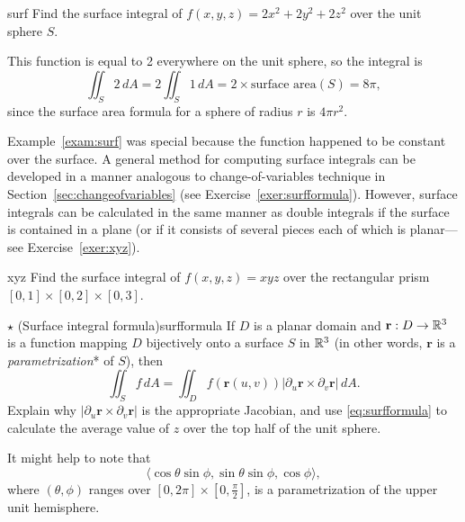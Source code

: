 \documentclass[svgnames]{report}
\begin{document}
\begin{example}{}{surf}
  Find the surface integral of $f(x,y,z) = 2x^2 +2y^2 + 2z^2$ over the
  unit sphere $S$. 
\end{example}

\begin{solution}
  This function is equal to 2 everywhere on the unit sphere, so the
  integral is
  \[
    \iint_{S} 2 \,dA =     2 \iint_{S} 1 \,dA = 2 \times \text{surface
      area}(S) = 8\pi, 
  \]
  since the surface area formula for a sphere of radius $r$ is $4\pi
  r^2$. 
\end{solution}

Example~\ref{exam:surf} was special because the function happened to
be constant over the surface. A general method for computing surface
integrals can be developed in a manner analogous to
change-of-variables technique in
Section~\ref{sec:changeofvariables} (see Exercise~\ref{exer:surfformula}).
However, surface integrals can be
calculated in the same manner as double integrals if the surface is
contained in a plane (or if it consists of several pieces each of
which is planar---see Exercise~\ref{exer:xyz}). 

\begin{exercise}{}{xyz}
  Find the surface integral of $f(x,y,z) = xyz$ over the rectangular
  prism $[0,1] \times [0,2] \times [0,3]$. 
\end{exercise}

\begin{exercise}{$\star$ (Surface integral formula)}{surfformula}
  If $D$ is a planar domain and $\mathbf{r}:D \to \mathbb{R}^3$ is a function
  mapping $D$ bijectively onto a surface $S$ in $\mathbb{R}^3$ (in other words,
  $\mathbf{r}$ is a \textit{parametrization}* of $S$), then
  \begin{equation} \label{eq:surfformula} 
    \iint_S f \, dA = \iint_D f(\mathbf{r}(u,v)) |\partial_u
    \mathbf{r} \times \partial_v \mathbf{r}| \, dA. 
  \end{equation}
  Explain why $|\partial_u
    \mathbf{r} \times \partial_v \mathbf{r}|$ is the appropriate
    Jacobian, and use \eqref{eq:surfformula} to calculate the average value of
    $z$ over the top half of the unit sphere.

    It might help to note that
    \[
      \langle \cos \theta \sin \phi, \sin \theta \sin \phi, \cos
      \phi
      \rangle, 
    \]
    where $(\theta,\phi)$ ranges over $[0,2\pi] \times
    [0,\tfrac{\pi}{2}]$, is a parametrization of the upper unit
    hemisphere. 
\end{exercise}
\end{document}
